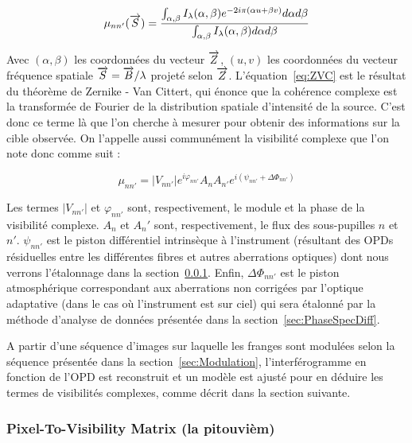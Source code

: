 \begin{equation}
    \mu_{nn'}(\overrightarrow{S}) = \frac{\int_{\alpha, \beta} I_{\lambda}(\alpha,\beta) e^{-2i\pi (\alpha u + \beta v)} d\alpha d\beta}{\int_{\alpha, \beta} I_{\lambda}(\alpha,\beta) d\alpha d\beta} \label{eq:ZVC}
\end{equation}

Avec $(\alpha,\beta)$ les coordonnées du vecteur $\overrightarrow{Z}$, $(u, v)$ les coordonnées du vecteur fréquence spatiale $\overrightarrow{S} = \overrightarrow{B}/\lambda$ projeté selon $\overrightarrow{Z}$. L'équation~\ref{eq:ZVC} est le résultat du théorème de Zernike - Van Cittert, qui énonce que la cohérence complexe est la transformée de Fourier de la distribution spatiale d'intensité de la source. C'est donc ce terme là que l'on cherche à mesurer pour obtenir des informations sur la cible observée. On l'appelle aussi communément la visibilité complexe que l'on note donc comme suit :

\begin{equation}
	\mu_{nn'} = |V_{nn'}| e^{i\varphi_{nn'}} A_n A_{n'} e^{i(\psi_{nn'} + \Delta\Phi_{nn'})} \label{eq:mu}
\end{equation}

Les termes $|V_{nn'}|$ et $\varphi_{nn'}$ sont, respectivement, le module et la phase de la visibilité complexe. $A_n$ et $A_n'$ sont, respectivement, le flux des sous-pupilles $n$ et $n'$. $\psi_{nn'}$ est le piston différentiel intrinsèque à l'instrument (résultant des OPDs résiduelles entre les différentes fibres et autres aberrations optiques) dont nous verrons l'étalonnage dans la section~\ref{sec:P2VM}. Enfin, $\Delta\Phi_{nn'}$ est le piston atmosphérique correspondant aux aberrations non corrigées par l'optique adaptative (dans le cas où l'instrument est sur ciel) qui sera étalonné par la méthode d'analyse de données présentée dans la section~\ref{sec:PhaseSpecDiff}.

A partir d'une séquence d'images sur laquelle les franges sont modulées selon la séquence présentée dans la section~\ref{sec:Modulation}, l'interférogramme en fonction de l'\ac{OPD} est reconstruit et un modèle est ajusté pour en déduire les termes de visibilités complexes, comme décrit dans la section suivante.


\subsubsection{Pixel-To-Visibility Matrix (la pitouvièm)}
\label{sec:P2VM}


